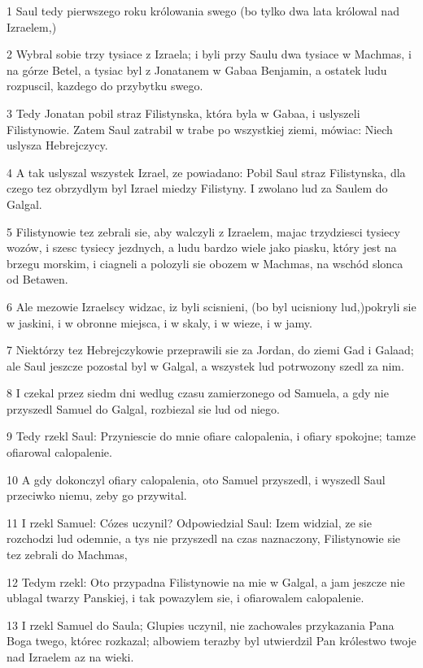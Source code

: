 \par 1 Saul tedy pierwszego roku królowania swego (bo tylko dwa lata królowal nad Izraelem,)
\par 2 Wybral sobie trzy tysiace z Izraela; i byli przy Saulu dwa tysiace w Machmas, i na górze Betel, a tysiac byl z Jonatanem w Gabaa Benjamin, a ostatek ludu rozpuscil, kazdego do przybytku swego.
\par 3 Tedy Jonatan pobil straz Filistynska, która byla w Gabaa, i uslyszeli Filistynowie. Zatem Saul zatrabil w trabe po wszystkiej ziemi, mówiac: Niech uslysza Hebrejczycy.
\par 4 A tak uslyszal wszystek Izrael, ze powiadano: Pobil Saul straz Filistynska, dla czego tez obrzydlym byl Izrael miedzy Filistyny. I zwolano lud za Saulem do Galgal.
\par 5 Filistynowie tez zebrali sie, aby walczyli z Izraelem, majac trzydziesci tysiecy wozów, i szesc tysiecy jezdnych, a ludu bardzo wiele jako piasku, który jest na brzegu morskim, i ciagneli a polozyli sie obozem w Machmas, na wschód slonca od Betawen.
\par 6 Ale mezowie Izraelscy widzac, iz byli scisnieni, (bo byl ucisniony lud,)pokryli sie w jaskini, i w obronne miejsca, i w skaly, i w wieze, i w jamy.
\par 7 Niektórzy tez Hebrejczykowie przeprawili sie za Jordan, do ziemi Gad i Galaad; ale Saul jeszcze pozostal byl w Galgal, a wszystek lud potrwozony szedl za nim.
\par 8 I czekal przez siedm dni wedlug czasu zamierzonego od Samuela, a gdy nie przyszedl Samuel do Galgal, rozbiezal sie lud od niego.
\par 9 Tedy rzekl Saul: Przyniescie do mnie ofiare calopalenia, i ofiary spokojne; tamze ofiarowal calopalenie.
\par 10 A gdy dokonczyl ofiary calopalenia, oto Samuel przyszedl, i wyszedl Saul przeciwko niemu, zeby go przywital.
\par 11 I rzekl Samuel: Cózes uczynil? Odpowiedzial Saul: Izem widzial, ze sie rozchodzi lud odemnie, a tys nie przyszedl na czas naznaczony, Filistynowie sie tez zebrali do Machmas,
\par 12 Tedym rzekl: Oto przypadna Filistynowie na mie w Galgal, a jam jeszcze nie ublagal twarzy Panskiej, i tak powazylem sie, i ofiarowalem calopalenie.
\par 13 I rzekl Samuel do Saula; Glupies uczynil, nie zachowales przykazania Pana Boga twego, którec rozkazal; albowiem terazby byl utwierdzil Pan królestwo twoje nad Izraelem az na wieki.
